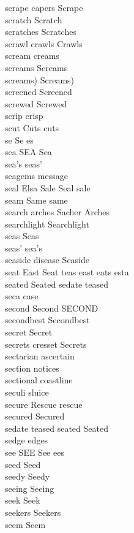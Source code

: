 scrape capers Scrape\\
scratch Scratch\\
scratches Scratches\\
scrawl crawls Crawls\\
scream creams\\
screams Screams\\
screams) Screams)\\
screened Screened\\
screwed Screwed\\
scrip crisp\\
scut Cuts cuts\\
se Se es\\
sea SEA Sea\\
sea's seas'\\
seagems message\\
seal Elsa Sale Seal sale\\
seam Same same\\
search arches Sacher Arches\\
searchlight Searchlight\\
seas Seas\\
seas' sea's\\
seaside disease Seaside\\
seat East Seat teas east eats esta\\
seated Seated sedate teased\\
seca case\\
second Second SECOND\\
secondbest Secondbest\\
secret Secret\\
secrets cresset Secrets\\
sectarian ascertain\\
section notices\\
sectional coastline\\
seculi sluice\\
secure Rescue rescue\\
secured Secured\\
sedate teased seated Seated\\
sedge edges\\
see SEE See ees\\
seed Seed\\
seedy Seedy\\
seeing Seeing\\
seek Seek\\
seekers Seekers\\
seem Seem\\
